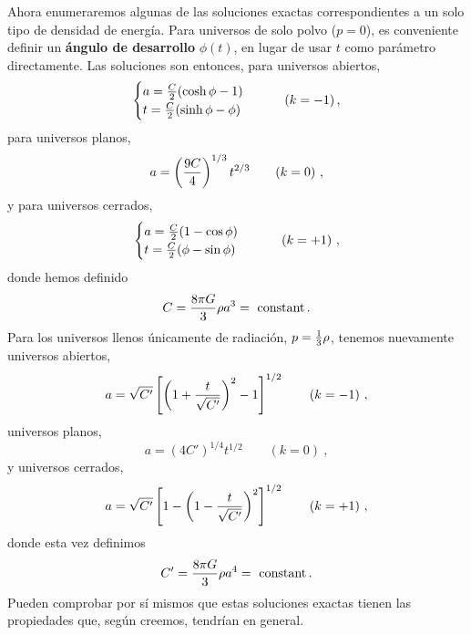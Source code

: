 \documentclass[11pt,b5paper,openany,twoside]{book}
\begin{document}
Ahora enumeraremos algunas de las soluciones exactas correspondientes a un solo tipo de densidad de energía.
Para universos de solo polvo ($p=0$), es conveniente definir un {\bf ángulo de desarrollo} $\phi(t)$, en lugar de usar $t$ como parámetro directamente.
Las soluciones son entonces, para universos abiertos,
\begin{equation}
\begin{cases}
a={C\over 2}(\cosh\phi-1) \\
t={C\over 2}(\sinh\phi-\phi)
\end{cases} \qquad (k=-1)\,,
\label{8.48}
\end{equation}
para universos planos,
\begin{equation}
a = \left({{9C}\over 4}\right)^{1/3} t^{2/3}\qquad (k=0)\ ,
\label{8.49}
\end{equation}
y para universos cerrados,
\begin{equation}
\begin{cases}
a = {C\over 2}(1-\cos\phi) \\
t = {C\over 2}(\phi-\sin\phi)\
\end{cases}\qquad (k=+1)\ ,\label{8.50}
\end{equation}
donde hemos definido
\begin{equation}
C={{8\pi G}\over 3}\rho a^3 = {\rm ~constant}\,.\label{8.51}
\end{equation}
Para los universos llenos únicamente de radiación, $p={1\over 3}\rho$, tenemos nuevamente universos abiertos,
\begin{equation}
a=\sqrt{C'}\left[\left(1+{t\over{\sqrt{C'}}}\right)^2-1\right]^{1/2}
\qquad (k=-1)\ ,\label{8.52}
\end{equation}
universos planos,
\begin{equation}
a=(4C')^{1/4} t^{1/2}\qquad (k=0)\ ,\label{8.53}
\end{equation}
y universos cerrados,
\begin{equation}
a=\sqrt{C'}\left[1-\left(1-{t\over{\sqrt{C'}}}\right)^2\right]^{1/2}
\qquad (k=+1)\ ,\label{8.54}
\end{equation}
donde esta vez definimos
\begin{equation}
C'={{8\pi G}\over 3}\rho a^4 = {\rm ~constant}\,.\label{8.55}
\end{equation}
Pueden comprobar por sí mismos que estas soluciones exactas tienen las propiedades que, según creemos, tendrían en general.
\end{document}

